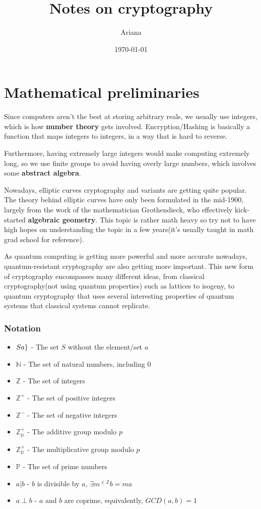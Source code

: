 \documentclass{report}
\title{Notes on cryptography}
\author{Ariana}
\date{\today}
\begin{document}
\maketitle
\tableofcontents{}
\part{Mathematical preliminaries}
Since computers aren't the best at storing arbitrary reals, we usually use integers, which is how \textbf{number theory} gets involved. Encryption/Hashing is basically a function that maps integers to integers, in a way that is hard to reverse.

Furthermore, having extremely large integers would make computing extremely long, so we use finite groups to avoid having overly large numbers, which involves some \textbf{abstract algebra}.

Nowadays, elliptic curves cryptography and variants are getting quite popular. The theory behind elliptic curves have only been formulated in the mid-1900, largely from the work of the mathematician Grothendieck, who effectively kick-started \textbf{algebraic geometry}. This topic is rather math heavy so try not to have high hopes on understanding the topic in a few years(it's usually taught in math grad school for reference). 

As quantum computing is getting more powerful and more accurate nowadays, quantum-resistant cryptography are also getting more important. This new form of cryptography encompasses many different ideas, from classical cryptography(not using quantum properties) such as lattices to isogeny, to quantum cryptography that uses several interesting properties of quantum systems that classical systems cannot replicate.

\section{Notation}
\begin{itemize}
	\item[]$S\\{a}\}$ - The set $S$ without the element/set $a$
	\item[]$\mathbb{N}$ - The set of natural numbers, including $0$
	\item[]$\mathbb{Z}$ - The set of integers
	\item[]$\mathbb{Z^+}$ - The set of positive integers
	\item[]$\mathbb{Z^-}$ - The set of negative integers
	\item[]$\mathbb{Z_p^+}$ - The additive group modulo $p$
	\item[]$\mathbb{Z_p^\times}$ - The multiplicative group modulo $p$
	\item[]$\mathbb{P}$ - The set of prime numbers
	\item[]$a|b$ - $b$ is divisible by $a$, $\exists m^{\in\mathbb{Z}}b=ma$
	\item[]$a\perp b$ - $a$ and $b$ are coprime, equivalently, $GCD(a,b)=1$
\end{itemize}
\end{document}
